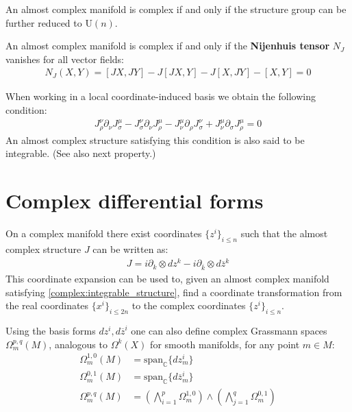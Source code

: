 	\begin{property}
		An almost complex manifold is complex if and only if the structure group can be further reduced to U$(n)$.
	\end{property}
	
	\begin{theorem}
		An almost complex manifold is complex if and only if the \textbf{Nijenhuis tensor} $N_J$ vanishes for all vector fields:
		\begin{gather}
			\label{complex:integrable_structure}
			N_J(X, Y) = [JX, JY] - J[JX, Y] - J[X, JY] - [X, Y] = 0
		\end{gather}
	\end{theorem}
	When working in a local coordinate-induced basis we obtain the following condition:
	\begin{gather}
		J_\rho^\nu\partial_\nu J_\sigma^\mu - J_\sigma^\nu\partial_\nu J_\rho^\mu - J_\nu^\mu\partial_\rho J_\sigma^\nu + J_\nu^\mu\partial_\sigma J_\rho^\mu = 0
	\end{gather}
	An almost complex structure satisfying this condition is also said to be integrable. (See also next property.)
	
\section{Complex differential forms}
	
	\begin{property}
		On a complex manifold there exist coordinates $\{z^i\}_{i\leq n}$ such that the almost complex structure $J$ can be written as:
		\begin{gather}
			\label{complex:complex_structure}
			J = i\partial_k\otimes dz^k - i\partial_{\overline{k}}\otimes d\overline{z}^k
		\end{gather}
		This coordinate expansion can be used to, given an almost complex manifold satisfying \ref{complex:integrable_structure}, find a coordinate transformation from the real coordinates $\{x^i\}_{i\leq2n}$ to the complex coordinates $\{z^i\}_{i\leq n}$.
	\end{property}

	Using the basis forms $dz^i, d\overline{z}^i$ one can also define complex Grassmann spaces $\Omega^{p, q}_m(M)$, analogous to $\Omega^k(X)$ for smooth manifolds, for any point $m\in M$:
	\begin{align}
		\Omega^{1, 0}_m(M) &= \text{span}_{\mathbb{C}}\{dz^i_m\}\\
		\Omega^{0, 1}_m(M) &= \text{span}_{\mathbb{C}}\{d\overline{z}^i_m\}\\
		\Omega^{p, q}_m(M) &= \left(\bigwedge_{i=1}^p\Omega^{1, 0}_m\right)\wedge\left(\bigwedge_{j=1}^q\Omega^{0, 1}_m\right)
	\end{align}
	
